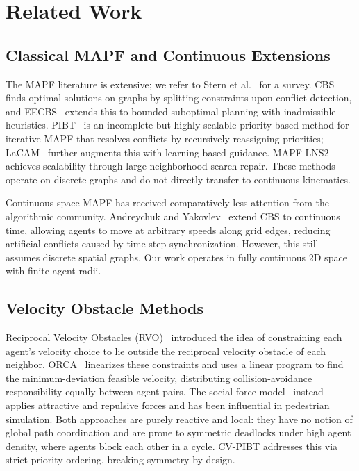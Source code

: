 \section{Related Work}
\label{sec:related}

\subsection{Classical MAPF and Continuous Extensions}

The MAPF literature is extensive; we refer to Stern et al.~\cite{stern2019mapfsurvey} for a survey. CBS~\cite{sharon2015cbs} finds optimal solutions on graphs by splitting constraints upon conflict detection, and EECBS~\cite{li2021eecbs} extends this to bounded-suboptimal planning with inadmissible heuristics. PIBT~\cite{okumura2022pibt} is an incomplete but highly scalable priority-based method for iterative MAPF that resolves conflicts by recursively reassigning priorities; LaCAM~\cite{okumura2023lacam} further augments this with learning-based guidance. MAPF-LNS2~\cite{li2022mapflns2} achieves scalability through large-neighborhood search repair. These methods operate on discrete graphs and do not directly transfer to continuous kinematics.

Continuous-space MAPF has received comparatively less attention from the algorithmic community. Andreychuk and Yakovlev~\cite{andreychuk2019ccbs} extend CBS to continuous time, allowing agents to move at arbitrary speeds along grid edges, reducing artificial conflicts caused by time-step synchronization. However, this still assumes discrete spatial graphs. Our work operates in fully continuous 2D space with finite agent radii.

\subsection{Velocity Obstacle Methods}

Reciprocal Velocity Obstacles (RVO)~\cite{vandenberg2008rvo} introduced the idea of constraining each agent's velocity choice to lie outside the reciprocal velocity obstacle of each neighbor. ORCA~\cite{vandenberg2011orca} linearizes these constraints and uses a linear program to find the minimum-deviation feasible velocity, distributing collision-avoidance responsibility equally between agent pairs. The social force model~\cite{helbing1995socialforce} instead applies attractive and repulsive forces and has been influential in pedestrian simulation. Both approaches are purely reactive and local: they have no notion of global path coordination and are prone to symmetric deadlocks under high agent density, where agents block each other in a cycle. CV-PIBT addresses this via strict priority ordering, breaking symmetry by design.

